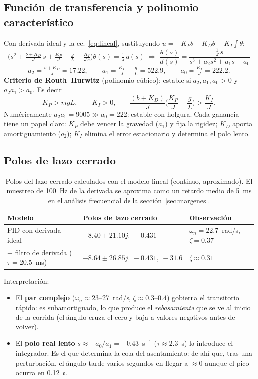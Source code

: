 \documentclass[11pt,a4paper]{article}
\begin{document}
\subsection{Funci\'on de transferencia y polinomio caracter\'istico}
Con derivada ideal y la ec.~\eqref{eq:lineal}, sustituyendo $u=-K_P\theta-K_D\dot\theta-K_I\!\int\theta$:
\begin{equation}
\Big(s^2+\tfrac{b+K_D}{J}\,s+\tfrac{K_P}{J}-\tfrac{g}{L}+\tfrac{K_I}{J\,s}\Big)\theta(s)=\tfrac{1}{J}\,d(s)
\;\Rightarrow\;
\frac{\theta(s)}{d(s)}=\frac{\tfrac1J\,s}{s^3+a_2s^2+a_1s+a_0}
\end{equation}
\begin{equation}
a_2=\tfrac{b+K_D}{J}=17.22,\qquad a_1=\tfrac{K_P}{J}-\tfrac gL=522.9,\qquad a_0=\tfrac{K_I}{J}=222.2 .
\end{equation}
\textbf{Criterio de Routh--Hurwitz} (polinomio c\'ubico): estable si $a_2,a_1,a_0>0$ y
$a_2a_1>a_0$. Es decir
\begin{equation}
K_P>mgL,\qquad K_I>0,\qquad \frac{(b+K_D)}{J}\Big(\frac{K_P}{J}-\frac gL\Big)>\frac{K_I}{J}.
\label{eq:routh}
\end{equation}
Num\'ericamente $a_2a_1=9005\gg a_0=222$: estable con holgura. Cada ganancia tiene un
papel claro: $K_P$ debe vencer la gravedad ($a_1$) y fija la rigidez; $K_D$ aporta
amortiguamiento ($a_2$); $K_I$ elimina el error estacionario y determina el polo lento.

\subsection{Polos de lazo cerrado}
\begin{table}[H]\centering\small
\begin{tabular}{@{}lll@{}}\toprule
Modelo & Polos de lazo cerrado & Observaci\'on \\ \midrule
PID con derivada ideal & $-8.40\pm21.10j,\ -0.431$ & $\omega_n=22.7$~rad/s, $\zeta=0.37$ \\
+ filtro de derivada ($\tau=20.5$~ms) & $-8.64\pm26.85j,\ -0.431,\ -31.6$ & $\zeta\approx0.31$ \\ \bottomrule
\end{tabular}
\caption{Polos del lazo cerrado calculados con el modelo lineal (continuo, aproximado).
El muestreo de 100~Hz de la derivada se aproxima como un retardo medio de 5~ms en el an\'alisis
frecuencial de la secci\'on~\ref{sec:margenes}.}
\end{table}
Interpretaci\'on:
\begin{itemize}[leftmargin=1.6em]
\item El \textbf{par complejo} ($\omega_n\approx23$--27~rad/s, $\zeta\approx0.3$--$0.4$) gobierna el
transitorio r\'apido: es subamortiguado, lo que produce el \emph{rebasamiento} que se ve al inicio
de la corrida (el \'angulo cruza el cero y baja a valores negativos antes de volver).
\item El \textbf{polo real lento} $s\approx-a_0/a_1=-0.43$~s$^{-1}$ ($\tau\approx2.3$~s) lo introduce el
integrador. Es el que determina la cola del asentamiento: de ah\'i que, tras una perturbaci\'on, el
\'angulo tarde varios segundos en llegar a $\approx0$ aunque el pico ocurra en 0.12~s.
\end{itemize}
\end{document}
